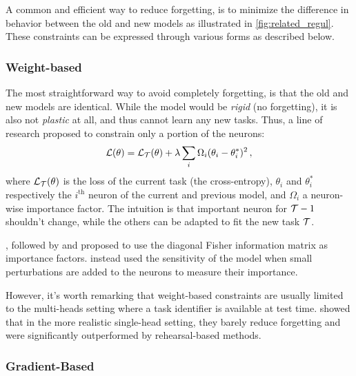 A common and efficient way to reduce forgetting, is to minimize the difference in behavior between
the old and new models as illustrated in \autoref{fig:related_regul}. These constraints can be
expressed through various forms as described below.

\subsubsection{Weight-based}
\label{sec:related_regul_weight}


The most straightforward way to avoid completely forgetting, is that the old and new
models are identical. While the model would be \textit{rigid} (no forgetting), it is also not
\textit{plastic} at all, and thus cannot learn any new tasks. Thus, a line of research proposed to
constrain only a portion of the neurons:
%
\begin{equation}
      \mathcal{L}(\theta) = \mathcal{L}_{\mathcal{T}}(\theta) + \lambda \sum_i \Omega_i (\theta_i - \theta_i^*)^2\,,
      \label{eq:related_weight_constraint}
\end{equation}
%
where $\mathcal{L}_{\mathcal{T}}(\theta)$ is the loss of the current task (\eg the cross-entropy), $\theta_i$ and
$\theta_i^*$ respectively the $i^\text{th}$ neuron of the current and previous model, and $\Omega_i$
a neuron-wise importance factor. The intuition is that important neuron for $\mathcal{T}-1$ shouldn't
change, while the others can be adapted to fit the new task $\mathcal{T}$.

\cite{kirkpatrick2017ewc}, followed by
\cite{zenke2017synaptic_intelligence} and \cite{chaudhry2018riemannien_walk}
proposed to use the diagonal Fisher information matrix as importance factors.
\cite{aljundi2018MemoryAwareSynapses} instead used the sensitivity of the model when
small perturbations are added to the neurons to measure their importance.

However, it's worth remarking that weight-based constraints are usually limited to the multi-heads
setting where a task identifier is available at test time. \cite{lesort2019regulshortcomings} showed
that in the more realistic single-head setting, they barely reduce forgetting and were significantly
outperformed by rehearsal-based methods.

\subsubsection{Gradient-Based}
\label{sec:related_regul_gradient}

